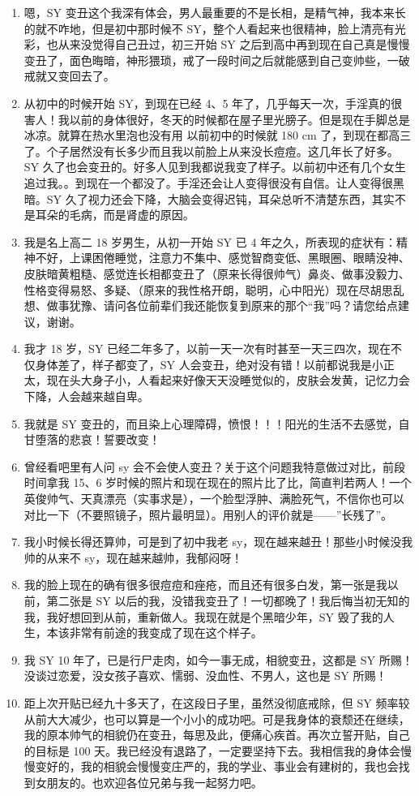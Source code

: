 \documentclass{ctexart}
\begin{document}
\begin{enumerate}
    \item 嗯，SY 变丑这个我深有体会，男人最重要的不是长相，是精气神，我本来长的就不咋地，但是初中那时候不 SY，整个人看起来也很精神，脸上清亮有光彩，也从来没觉得自己丑过，初三开始 SY 之后到高中再到现在自己真是慢慢变丑了，面色晦暗，神形猥琐，戒了一段时间之后就能感到自己变帅些，一破戒就又变回去了。
    \item 从初中的时候开始 SY，到现在已经 4、5 年了，几乎每天一次，手淫真的很害人！我以前的身体很好，冬天的时候都在屋子里光膀子。但是现在手脚总是冰凉。就算在热水里泡也没有用 以前初中的时候就 180 cm 了，到现在都高三了。个子居然没有长多少而且我以前脸上从来没长痘痘。这几年长了好多。SY 久了也会变丑的。好多人见到我都说我变了样子。以前初中还有几个女生追过我。。到现在一个都没了。手淫还会让人变得很没有自信。让人变得很黑暗。SY 久了视力还会下降，大脑会变得迟钝，耳朵总听不清楚东西，其实不是耳朵的毛病，而是肾虚的原因。
    \item 我是名上高二 18 岁男生，从初一开始 SY 已 4 年之久，所表现的症状有：精神不好，上课困倦睡觉，注意力不集中、感觉智商变低、黑眼圈、眼睛没神、皮肤暗黄粗糙、感觉连长相都变丑了（原来长得很帅气）鼻炎、做事没毅力、性格变得易怒、多疑、（原来的我性格开朗，聪明，心中阳光）现在尽胡思乱想、做事犹豫、请问各位前辈们我还能恢复到原来的那个“我”吗？请您给点建议，谢谢。
    \item 我才 18 岁，SY 已经二年多了，以前一天一次有时甚至一天三四次，现在不仅身体差了，样子都变了，SY 人会变丑，绝对没有错！以前都说我是小正太，现在头大身子小，人看起来好像天天没睡觉似的，皮肤会发黄，记忆力会下降，人会越来越自卑。
    \item 我就是 SY 变丑的，而且染上心理障碍，愤恨！！！阳光的生活不去感觉，自甘堕落的悲哀！誓要改变！
    \item 曾经看吧里有人问 sy 会不会使人变丑？关于这个问题我特意做过对比，前段时间拿我 15、6 岁时候的照片和现在现在的照片比了比，简直判若两人！一个英俊帅气、天真漂亮（实事求是），一个脸型浮肿、满脸死气，不信你也可以对比一下（不要照镜子，照片最明显）。用别人的评价就是——”长残了”。
    \item 我小时候长得还算帅，可是到了初中我老 sy，现在越来越丑！那些小时候没我帅的从来不 sy，现在越来越帅，我郁闷呀！
    \item 我的脸上现在的确有很多很痘痘和痤疮，而且还有很多白发，第一张是我以前，第二张是 SY 以后的我，没错我变丑了！一切都晚了！我后悔当初无知的我，我好想回到从前，重新做人。我现在就是个黑暗少年，SY 毁了我的人生，本该非常有前途的我变成了现在这个样子。
    \item 我 SY 10 年了，已是行尸走肉，如今一事无成，相貌变丑，这都是 SY 所赐！没谈过恋爱，没女孩子喜欢、懦弱、没血性、不男人，这也是 SY 所赐！
    \item 距上次开贴已经九十多天了，在这段日子里，虽然没彻底戒除，但 SY 频率较从前大大减少，也可以算是一个小小的成功吧。可是我身体的衰颓还在继续，我的原本帅气的相貌仍在变丑，每思及此，便痛心疾首。再次立誓开贴，自己的目标是 100 天。我已经没有退路了，一定要坚持下去。我相信我的身体会慢慢变好的，我的相貌会慢慢变庄严的，我的学业、事业会有建树的，我也会找到女朋友的。也欢迎各位兄弟与我一起努力吧。
\end{enumerate}
\end{document}
